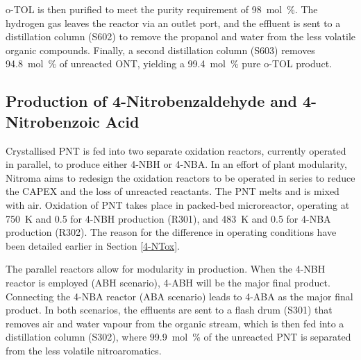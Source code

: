 
o-TOL is then purified to meet the purity requirement of \SI{98}{mol\percent}. The hydrogen gas leaves the reactor via an outlet port, and the effluent is sent to a distillation column (S602) to remove the propanol and water from the less volatile organic compounds. Finally, a second distillation column (S603) removes \SI{94.8}{mol\percent} of unreacted ONT, yielding a \SI{99.4}{mol\percent} pure o-TOL product.
 
\subsection{Production of 4-Nitrobenzaldehyde and 4-Nitrobenzoic Acid}
Crystallised PNT is fed into two separate oxidation reactors, currently operated in parallel, to produce either 4-NBH or 4-NBA. In an effort of plant modularity, Nitroma aims to redesign the oxidation reactors to be operated in series to reduce the CAPEX and the loss of unreacted reactants. The PNT melts and is mixed with air. Oxidation of PNT takes place in packed-bed microreactor, operating at \SI{750}{\K} and \SI{0.5}{\atm} for 4-NBH production (R301), and \SI{483}{\K} and \SI{0.5}{\atm} for 4-NBA production (R302). The reason for the difference in operating conditions have been detailed earlier in Section \ref{4-NTox}.


The parallel reactors allow for modularity in production. When the 4-NBH reactor is employed (ABH scenario), 4-ABH will be the major final product. Connecting the 4-NBA reactor (ABA scenario) leads to 4-ABA as the major final product. In both scenarios, the effluents are sent to a flash drum (S301) that removes air and water vapour from the organic stream, which is then fed into a distillation column (S302), where \SI{99.9}{mol\percent} of the unreacted PNT is separated from the less volatile nitroaromatics. 

